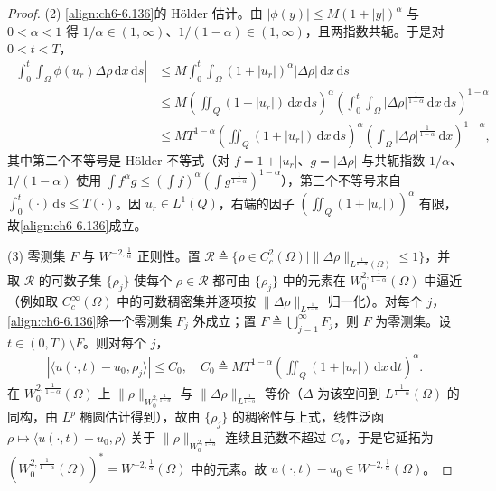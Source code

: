\documentclass[../../main.tex]{subfiles}%
\begin{document}
\begin{proof}
(2) \eqref{align:ch6-6.136}的 Hölder 估计。由 $|\phi(y)|\leqslant M(1+|y|)^\alpha$ 与 $0<\alpha<1$ 得 $1/\alpha\in(1,\infty)$、$1/(1-\alpha)\in(1,\infty)$，且两指数共轭。于是对 $0<t<T$，
\begin{align*}
\left|\int_0^t\int_\Omega\phi(u_r)\Delta\rho\,\mathrm{d}x\,\mathrm{d}s\right|
&\leqslant M\int_0^t\int_\Omega(1+|u_r|)^{\alpha}|\Delta\rho|\,\mathrm{d}x\,\mathrm{d}s\\
&\leqslant M\left(\iint_Q(1+|u_r|)\,\mathrm{d}x\,\mathrm{d}s\right)^{\alpha}
\left(\int_0^t\int_\Omega|\Delta\rho|^{\frac{1}{1-\alpha}}\,\mathrm{d}x\,\mathrm{d}s\right)^{1-\alpha}\\
&\leqslant MT^{1-\alpha}\left(\iint_Q(1+|u_r|)\,\mathrm{d}x\,\mathrm{d}s\right)^{\alpha}
\left(\int_\Omega|\Delta\rho|^{\frac{1}{1-\alpha}}\,\mathrm{d}x\right)^{1-\alpha},
\end{align*}
其中第二个不等号是 Hölder 不等式（对 $f=1+|u_r|$、$g=|\Delta\rho|$ 与共轭指数 $1/\alpha$、$1/(1-\alpha)$ 使用 $\int f^\alpha g\leqslant(\int f)^{\alpha}(\int g^{\frac{1}{1-\alpha}})^{1-\alpha}$），第三个不等号来自 $\int_0^t(\cdot)\,\mathrm{d}s\leqslant T(\cdot)$。因 $u_r\in L^1(Q)$，右端的因子 $(\iint_Q(1+|u_r|))^{\alpha}$ 有限，故\eqref{align:ch6-6.136}成立。

(3) 零测集 $F$ 与 $W^{-2,\frac{1}{\alpha}}$ 正则性。置 $\mathcal{R}\triangleq\{\rho\in C^2_c(\Omega)\mid\|\Delta\rho\|_{L^{\frac{1}{1-\alpha}}(\Omega)}\leqslant1\}$，并取 $\mathcal{R}$ 的可数子集 $\{\rho_j\}$ 使每个 $\rho\in\mathcal{R}$ 都可由 $\{\rho_j\}$ 中的元素在 $W^{2,\frac{1}{1-\alpha}}_0(\Omega)$ 中逼近（例如取 $C^\infty_c(\Omega)$ 中的可数稠密集并逐项按 $\|\Delta\rho\|_{L^{\frac{1}{1-\alpha}}}$ 归一化）。对每个 $j$，\eqref{align:ch6-6.136}除一个零测集 $F_j$ 外成立；置 $F\triangleq\bigcup_{j=1}^{\infty}F_j$，则 $F$ 为零测集。设 $t\in(0,T)\setminus F$。则对每个 $j$，
\begin{align*}
|\langle u(\cdot,t)-u_0,\rho_j\rangle|\leqslant C_0,
\quad C_0\triangleq MT^{1-\alpha}\left(\iint_Q(1+|u_r|)\,\mathrm{d}x\,\mathrm{d}t\right)^{\alpha}.
\end{align*}
在 $W^{2,\frac{1}{1-\alpha}}_0(\Omega)$ 上 $\|\rho\|_{W^{2,\frac{1}{1-\alpha}}_0}$ 与 $\|\Delta\rho\|_{L^{\frac{1}{1-\alpha}}}$ 等价（$\Delta$ 为该空间到 $L^{\frac{1}{1-\alpha}}(\Omega)$ 的同构，由 $L^p$ 椭圆估计得到），故由 $\{\rho_j\}$ 的稠密性与上式，线性泛函 $\rho\mapsto\langle u(\cdot,t)-u_0,\rho\rangle$ 关于 $\|\rho\|_{W^{2,\frac{1}{1-\alpha}}_0}$ 连续且范数不超过 $C_0$，于是它延拓为 $(W^{2,\frac{1}{1-\alpha}}_0(\Omega))^*=W^{-2,\frac{1}{\alpha}}(\Omega)$ 中的元素。故 $u(\cdot,t)-u_0\in W^{-2,\frac{1}{\alpha}}(\Omega)$。


\end{proof}
\end{document}
